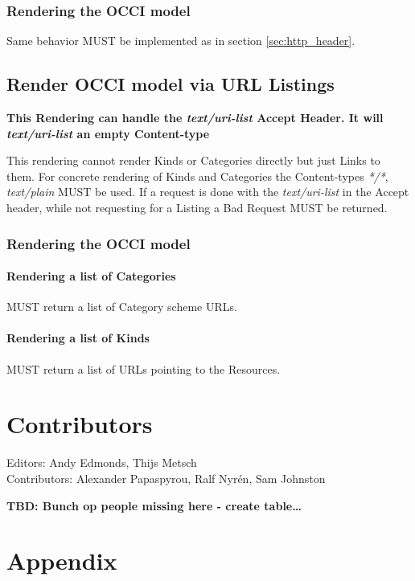 \documentclass[10pt,a4paper]{article}
\begin{document}
\subsubsection{Rendering the OCCI model}

Same behavior MUST be implemented as in section \ref{sec:http_header}.

\subsection{Render OCCI model via URL Listings}

\textbf{This Rendering can handle the \textit{text/uri-list} Accept Header. It will \textit{text/uri-list} an empty Content-type}

This rendering cannot render Kinds or Categories directly but just Links to them. For concrete rendering of Kinds and Categories the Content-types \textit{*/*}, \textit{text/plain} MUST be used. If a request is done with the \textit{text/uri-list} in the Accept header, while not requesting for a Listing a Bad Request MUST be returned.

\subsubsection{Rendering the OCCI model}

\paragraph{Rendering a list of Categories}

MUST return a list of Category scheme URLs.

\paragraph{Rendering a list of Kinds}

MUST return a list of URLs pointing to the Resources.

\section{Contributors}

Editors: Andy Edmonds, Thijs Metsch \\
Contributors: Alexander Papaspyrou, Ralf Nyrén, Sam Johnston

\textbf{TBD: Bunch op people missing here - create table\ldots}

\section{Appendix}
\end{document}
